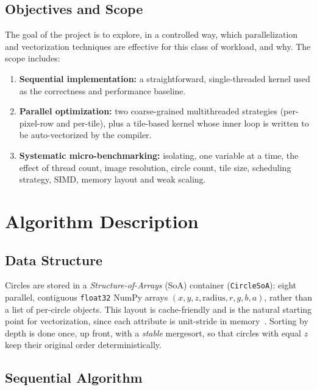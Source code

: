 \documentclass[10pt,twocolumn,letterpaper]{article}
\begin{document}
\subsection{Objectives and Scope}

The goal of the project is to explore, in a controlled way, which parallelization
and vectorization techniques are effective for this class of workload, and why.
The scope includes:
\begin{enumerate}[itemsep=1pt,topsep=2pt]
  \item \textbf{Sequential implementation:} a straightforward, single-threaded
    kernel used as the correctness and performance baseline.
  \item \textbf{Parallel optimization:} two coarse-grained multithreaded
    strategies (per-pixel-row and per-tile), plus a tile-based kernel whose
    inner loop is written to be auto-vectorized by the compiler.
  \item \textbf{Systematic micro-benchmarking:} isolating, one variable at a
    time, the effect of thread count, image resolution, circle count, tile
    size, scheduling strategy, SIMD, memory layout and weak scaling.
\end{enumerate}

\section{Algorithm Description}

\subsection{Data Structure}

Circles are stored in a \emph{Structure-of-Arrays} (SoA) container
(\texttt{CircleSoA}): eight parallel, contiguous \texttt{float32} NumPy arrays
$(x, y, z, \text{radius}, r, g, b, a)$, rather than a list of per-circle
objects. This layout is cache-friendly and is the natural starting point for
vectorization, since each attribute is unit-stride in memory~\cite{robey}. Sorting by depth
is done once, up front, with a \emph{stable} mergesort, so that circles with
equal $z$ keep their original order deterministically.

\subsection{Sequential Algorithm}
\end{document}
